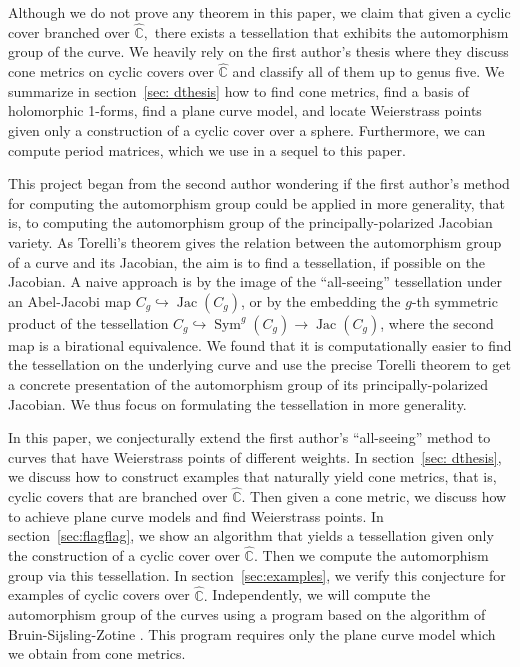 \documentclass[12pt,reqno]{amsart}
\DeclareMathOperator{\Jac}{Jac}
\DeclareMathOperator{\Sym}{Sym}
\newcommand{\C}{\mathbb{C}}
\theoremstyle{definition}
\theoremstyle{remark}
\begin{document}
Although we do not prove any theorem in this paper, we claim that given a cyclic cover branched over $\widehat{\C},$ there exists a tessellation that exhibits the automorphism group of the curve. We heavily rely on the first author's thesis \cite{dthesis} where they discuss cone metrics on cyclic covers over $\widehat{\C}$ and classify all of them up to genus five. We summarize in section~\ref{sec: dthesis} how to find cone metrics, find a basis of holomorphic 1-forms, find a plane curve model, and locate Weierstrass points given only a construction of a cyclic cover over a sphere. Furthermore, we can compute period matrices, which we use in a sequel to this paper. 

This project began from the second author wondering if the first author's method for computing the automorphism group could be applied in more generality, that is, to computing the automorphism group of the principally-polarized Jacobian variety. As Torelli's theorem gives the relation between the automorphism group of a curve and its Jacobian, the aim is to find a tessellation, if possible on the Jacobian. A naive approach is by the image of the ``all-seeing'' tessellation under an Abel-Jacobi map $C_g \hookrightarrow \Jac(C_g)$, or by the embedding the $g$-th symmetric product of the tessellation $C_g \hookrightarrow \Sym^g(C_g) \to \Jac(C_g)$, where the second map is a birational equivalence. We found that it is computationally easier to find the tessellation on the underlying curve and use the precise Torelli theorem to get a concrete presentation of the automorphism group of its principally-polarized Jacobian. We thus focus on formulating the tessellation in more generality.

In this paper, we conjecturally extend the first author's ``all-seeing'' method to curves that have Weierstrass points of different weights. In section~\ref{sec: dthesis}, we discuss how to construct examples that naturally yield cone metrics, that is, cyclic covers that are branched over $\widehat{\C}.$ Then given a cone metric, we discuss how to achieve plane curve models and find Weierstrass points. In section~\ref{sec:flagflag}, we show an algorithm that yields a tessellation given only the construction of a cyclic cover over $\widehat{\C}.$ Then we compute the automorphism group via this tessellation. In section~\ref{sec:examples}, we verify this conjecture for examples of cyclic covers over $\widehat{\C}.$ Independently, we will compute the automorphism group of the curves using a program based on the algorithm of Bruin-Sijsling-Zotine \cite{jeroen}. This program requires only the plane curve model which we obtain from cone metrics. 
\end{document}
